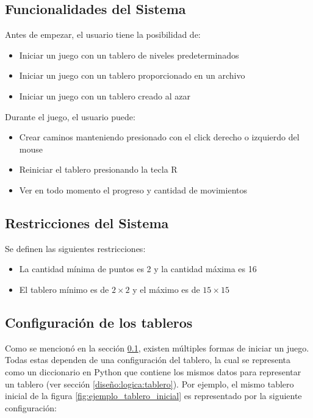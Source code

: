 \documentclass[letter,12pt]{article}
\begin{document}
\subsection{Funcionalidades del Sistema} \label{implementacion:funcionalidades}

Antes de empezar, el usuario tiene la posibilidad de: \par

\begin{itemize}
    \item Iniciar un juego con un tablero de niveles predeterminados
    \item Iniciar un juego con un tablero proporcionado en un archivo
    \item Iniciar un juego con un tablero creado al azar
\end{itemize}

Durante el juego, el usuario puede: \par

\begin{itemize}
    \item Crear caminos manteniendo presionado con el click derecho o izquierdo del mouse
    \item Reiniciar el tablero presionando la tecla R
    \item Ver en todo momento el progreso y cantidad de movimientos
\end{itemize}

\subsection{Restricciones del Sistema} \label{implementacion:restricciones}

Se definen las siguientes restricciones: \par

\begin{itemize}
    \item La cantidad mínima de puntos es 2 y la cantidad máxima es 16
    \item El tablero mínimo es de $2 \times 2$ y el máximo es de $15 \times 15$
\end{itemize}

\subsection{Configuración de los tableros} \label{implementacion:configuracion}

Como se mencionó en la sección \ref{implementacion:funcionalidades}, existen múltiples formas de iniciar un juego. Todas estas dependen de una configuración del tablero, la cual se representa como un diccionario en Python que contiene los mismos datos para representar un tablero (ver sección \ref{diseño:logica:tablero}). Por ejemplo, el mismo tablero inicial de la figura \ref{fig:ejemplo_tablero_inicial} es representado por la siguiente configuración: \par
\end{document}
